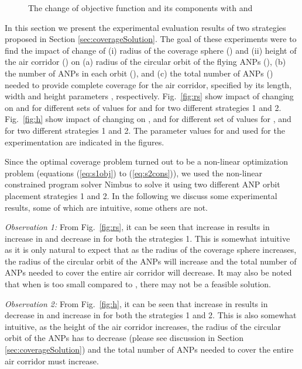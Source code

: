 \documentclass[10pt]{IEEEtran}
\begin{document}
\begin{figure*}
 \centering
 \hfill
 \hfill
 \caption{The change of objective function and its components with  and }
 \label{fig:objs}
\end{figure*}

In this section we present the experimental evaluation results of two strategies proposed in Section \ref{sec:coverageSolution}.  The goal of these experiments were to find the impact of change of (i) radius of the coverage sphere () and (ii) height of the air corridor () on (a) radius  of the circular orbit of the flying ANPs (), (b) the number of ANPs in each orbit (), and (c) the total number of ANPs () needed to provide complete coverage for the air corridor, specified by its length, width and height parameters , respectively.  Fig.~\ref{fig:rs} show impact of changing  on  and  for different sets of values for  and for two different strategies 1 and 2. Fig.~\ref{fig:h} show impact of changing  on ,  and  for different set of values for ,  and for two different strategies 1 and 2. The parameter values for  and  used for the experimentation are indicated in the figures.

Since the optimal coverage problem turned out to be a non-linear optimization problem (equations (\ref{eq:s1obj}) to (\ref{eq:s2cons})), we used the non-linear constrained program solver Nimbus \cite{nimbus} to solve it using two different ANP orbit placement strategies 1 and 2. In the following we discuss some experimental results, some of which are intuitive, some others are not.

\medskip
\noindent
{\em Observation 1: }From Fig.~\ref{fig:rs}, it can be seen that increase in  results in increase in  and decrease in  for both the strategies 1. This is somewhat intuitive as it is only natural to expect that as the radius of the coverage sphere increases, the radius of the circular orbit of the ANPs will increase and the total number of ANPs needed to cover the entire air corridor will decrease. It may also be noted that when  is too small compared to , there may not be a feasible solution.
    
\medskip
\noindent
{\em Observation 2: }From Fig.~\ref{fig:h}, it can be seen that increase in  results in decrease in  and increase in  for both the strategies 1 and 2. This is also somewhat intuitive,  as the height of the air corridor increases, the radius of the circular orbit of the ANPs has to decrease (please see discussion in Section \ref{sec:coverageSolution}) and the total number of ANPs needed to cover the entire air corridor must increase. 
\end{document}
